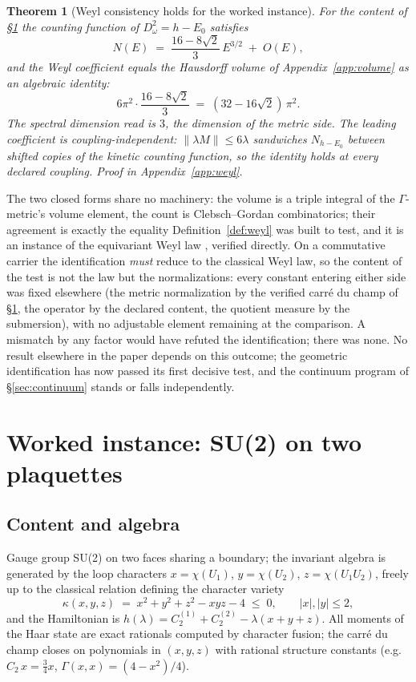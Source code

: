 \documentclass[11pt]{article}
\newtheorem{theorem}{Theorem}[section]
\theoremstyle{definition}
\theoremstyle{remark}
\begin{document}
\begin{theorem}[Weyl consistency holds for the worked instance]
\label{thm:weylinstance}
For the content of \S\ref{sec:instance} the counting function of
$D_\omega^2 = h - E_0$ satisfies
\[
N(E) \;=\; \frac{16 - 8\sqrt2}{3}\,E^{3/2} \;+\; O(E),
\]
and the Weyl coefficient equals the Hausdorff volume of
Appendix~\ref{app:volume} as an algebraic identity:
\[
6\pi^2 \cdot \frac{16 - 8\sqrt2}{3} \;=\; (32 - 16\sqrt2)\,\pi^2 .
\]
The spectral dimension read is $3$, the dimension of the metric side.
The leading coefficient is coupling-independent: $\|\lambda M\| \le
6\lambda$ sandwiches $N_{h-E_0}$ between shifted copies of the kinetic
counting function, so the identity holds at every declared coupling.
Proof in Appendix~\ref{app:weyl}.
\end{theorem}

\noindent The two closed forms share no machinery: the volume is a
triple integral of the $\Gamma$-metric's volume element, the count is
Clebsch--Gordan combinatorics; their agreement is exactly the equality
Definition~\ref{def:weyl} was built to test, and it is an instance of
the equivariant Weyl law \cite{donnelly,bruningheintze}, verified
directly.  On a commutative carrier
the identification \emph{must} reduce to the classical Weyl law, so
the content of the test is not the law but the normalizations: every
constant entering either side was fixed elsewhere (the metric
normalization by the verified carr\'e du champ of
\S\ref{sec:instance}, the operator by the declared content, the
quotient measure by the submersion), with no adjustable element
remaining at the comparison.  A mismatch by any factor would have
refuted the identification; there was none.  No result elsewhere in
the paper depends on this outcome; the geometric identification has
now passed its first decisive test, and the continuum program of
\S\ref{sec:continuum} stands or falls independently.

\section{Worked instance: SU(2) on two plaquettes}\label{sec:instance}

\subsection{Content and algebra}
Gauge group SU(2) on two faces sharing a boundary; the invariant algebra
is generated by the loop characters $x = \chi(U_1)$, $y = \chi(U_2)$,
$z = \chi(U_1 U_2)$, freely up to the classical relation defining the
character variety
\[
\kappa(x,y,z) \;=\; x^2 + y^2 + z^2 - xyz - 4 \;\le\; 0,
\qquad |x|,|y| \le 2,
\]
and the Hamiltonian is $h(\lambda) = C_2^{(1)} + C_2^{(2)} -
\lambda(x+y+z)$.  All moments of the Haar state are exact rationals
computed by character fusion; the carr\'e du champ closes on polynomials
in $(x,y,z)$ with rational structure constants (e.g.\ $C_2\,x =
\tfrac34 x$, $\Gamma(x,x) = (4 - x^2)/4$).
\end{document}
